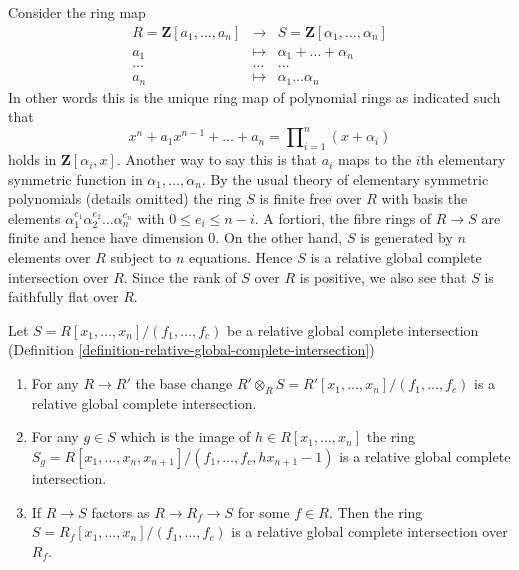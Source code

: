 \begin{example}
\label{example-roots-universal-polynomial}
Consider the ring map
\begin{eqnarray*}
R = \mathbf{Z}[a_1, \ldots, a_n]
& \longrightarrow &
S = \mathbf{Z}[\alpha_1, \ldots, \alpha_n] \\
a_1 & \longmapsto &
\alpha_1 + \ldots + \alpha_n \\
\ldots & \ldots & \ldots \\
a_n & \longmapsto & \alpha_1 \ldots \alpha_n
\end{eqnarray*}
In other words this is the unique ring map of polynomial
rings as indicated such that
$$
x^n + a_1 x^{n - 1} + \ldots + a_n
=
\prod\nolimits_{i = 1}^n (x + \alpha_i)
$$
holds in $\mathbf{Z}[\alpha_i, x]$. Another way to say this
is that $a_i$ maps to the $i$th elementary symmetric function
in $\alpha_1, \ldots, \alpha_n$. By the usual theory of elementary
symmetric polynomials (details omitted) the ring $S$ is finite
free over $R$ with basis the elements
$\alpha_1^{e_1} \alpha_2^{e_2} \ldots \alpha_n^{e_n}$ with
$0 \leq e_i \leq n - i$. A fortiori, the fibre rings of
$R \to S$ are finite and hence have dimension $0$.
On the other hand, $S$ is generated by
$n$ elements over $R$ subject to $n$ equations. Hence $S$
is a relative global complete intersection over $R$.
Since the rank of $S$ over $R$ is positive, we also see
that $S$ is faithfully flat over $R$.
\end{example}

\begin{lemma}
\label{lemma-base-change-relative-global-complete-intersection}
Let $S = R[x_1, \ldots, x_n]/(f_1, \ldots, f_c)$ be a
relative global complete intersection
(Definition \ref{definition-relative-global-complete-intersection})
\begin{enumerate}
\item For any $R \to R'$ the base change
$R' \otimes_R S = R'[x_1, \ldots, x_n]/(f_1, \ldots, f_c)$ is a relative
global complete intersection.
\item For any $g \in S$ which is the image of $h \in R[x_1, \ldots, x_n]$
the ring
$S_g = R[x_1, \ldots, x_n, x_{n + 1}]/(f_1, \ldots, f_c, hx_{n + 1} - 1)$
is a relative global complete intersection.
\item If $R \to S$ factors as $R \to R_f \to S$ for some $f \in R$.
Then the ring $S = R_f[x_1, \ldots, x_n]/(f_1, \ldots, f_c)$
is a relative global complete intersection over $R_f$.
\end{enumerate}
\end{lemma}


